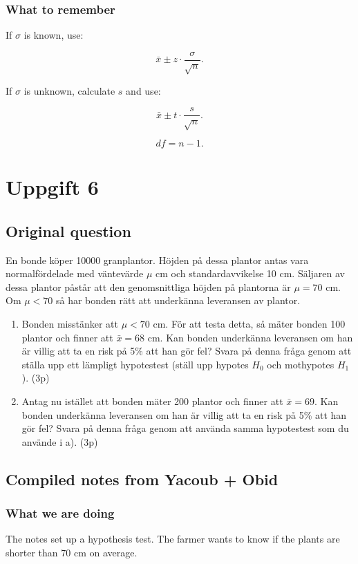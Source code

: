 \documentclass[10pt]{article}
\begin{document}
\subsubsection*{What to remember}
If \(\sigma\) is known, use:

\[
\bar{x}\pm z\cdot \frac{\sigma}{\sqrt{n}}.
\]

If \(\sigma\) is unknown, calculate \(s\) and use:

\[
\bar{x}\pm t\cdot \frac{s}{\sqrt{n}}.
\]

\[
df=n-1.
\]

\section*{Uppgift 6}

\subsection*{Original question}
En bonde köper 10000 granplantor.
Höjden på dessa plantor antas vara normalfördelade
med väntevärde \(\mu\) cm och standardavvikelse
10 cm.
Säljaren av dessa plantor påstår att den genomsnittliga
höjden på plantorna är \(\mu=70\) cm.
Om \(\mu<70\) så har bonden rätt att underkänna
leveransen av plantor.

\begin{enumerate}[label=\alph*)]
\item Bonden misstänker att \(\mu<70\) cm.
För att testa detta, så mäter bonden 100 plantor
och finner att \(\bar{x}=68\) cm.
Kan bonden underkänna leveransen om han är villig
att ta en risk på 5\% att han gör fel?
Svara på denna fråga genom att ställa upp ett
lämpligt hypotestest (ställ upp hypotes \(H_0\)
och mothypotes \(H_1\)).
\hfill (3p)

\item Antag nu istället att bonden mäter 200 plantor
och finner att \(\bar{x}=69\).
Kan bonden underkänna leveransen om han är villig
att ta en risk på 5\% att han gör fel?
Svara på denna fråga genom att använda samma
hypotestest som du använde i a).
\hfill (3p)
\end{enumerate}

\subsection*{Compiled notes from Yacoub + Obid}

\subsubsection*{What we are doing}
The notes set up a hypothesis test.
The farmer wants to know if the plants are shorter
than \(70\) cm on average.
\end{document}
